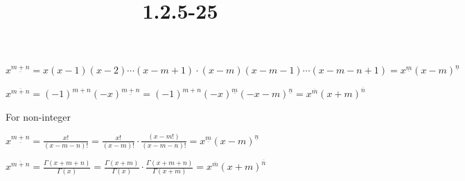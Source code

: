 \documentclass{article}
\title{1.2.5-25}
\begin{document}
\maketitle

$x^{\underline{m+n}} = x(x-1)(x-2)\cdots(x-m+1)\cdot(x-m)(x-m-1)\cdots(x-m-n+1) = x^{\underline{m}}(x-m)^{\underline{n}}$

$x^{\overline{m+n}} = (-1)^{m+n}(-x)^{\underline{m+n}} = (-1)^{m+n}(-x)^{\underline{m}}(-x-m)^{\underline{n}} = x^{\overline{m}} (x+m)^{\overline{n}}$

For non-integer

$x^{\underline{m+n}} = \frac{x!}{(x-m-n)!} = \frac{x!}{(x-m)!} \cdot \frac{(x-m!)}{(x-m-n)!} = x^{\underline{m}}(x-m)^{\underline{n}}$

$x^{\overline{m+n}} = \frac{\Gamma(x + m + n)}{\Gamma(x)} = \frac{\Gamma(x+m)}{\Gamma(x)} \cdot \frac{\Gamma(x+m+n)}{\Gamma(x+m)} = x^{\overline{m}} (x+m)^{\overline{n}}$
\end{document}
